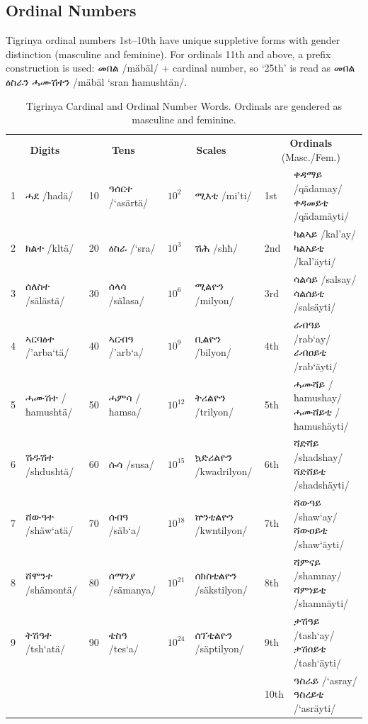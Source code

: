 \documentclass{article}
\newcommand{\tiipa}[2]{{\geezfont #1} /#2/}
\begin{document}
\subsection{Ordinal Numbers}

Tigrinya ordinal numbers 1st--10th have unique suppletive forms with gender distinction (masculine and feminine). For ordinals 11th and above, a prefix construction is used: \tiipa{መበል}{mäbäl} + cardinal number, so `25th' is read as \tiipa{መበል ዕስራን ሓሙሽተን}{mäbäl `sran ħamushtän}.

\begin{table}[t]
\caption{Tigrinya Cardinal and Ordinal Number Words. Ordinals are gendered as masculine and feminine.}
\label{tab:numbers}
\centering
\footnotesize
\begin{tabular}{@{\hspace{3pt}}cl@{\hspace{9pt}}cl@{\hspace{9pt}}ll@{\hspace{9pt}}ll@{\hspace{3pt}}}
\toprule
\multicolumn{2}{c}{\textbf{Digits}} & \multicolumn{2}{c}{\textbf{Tens}} & \multicolumn{2}{c}{\textbf{Scales}} & \multicolumn{2}{c}{\textbf{Ordinals} (Masc./Fem.)} \\
\cmidrule(r){1-2} \cmidrule(lr){3-4} \cmidrule(lr){5-6} \cmidrule(l){7-8}
1 & \tiipa{ሓደ}{ħadä} & 10 & \tiipa{ዓሰርተ}{`asärtä} & $10^2$ & \tiipa{ሚእቲ}{mi'ti} & 1st & \tiipa{ቀዳማይ}{qädamay} \tiipa{ቀዳመይቲ}{qädamäyti} \\
2 & \tiipa{ክልተ}{kltä} & 20 & \tiipa{ዕስራ}{`sra} & $10^3$ & \tiipa{ሽሕ}{shħ} & 2nd & \tiipa{ካልኣይ}{kal'ay} \tiipa{ካልአይቲ}{kal'äyti} \\
3 & \tiipa{ሰለስተ}{sälästä} & 30 & \tiipa{ሰላሳ}{sälasa} & $10^6$ & \tiipa{ሚልዮን}{milyon} & 3rd & \tiipa{ሳልሳይ}{salsay} \tiipa{ሳልሰይቲ}{salsäyti} \\
4 & \tiipa{ኣርባዕተ}{'arba`tä} & 40 & \tiipa{ኣርብዓ}{'arb`a} & $10^9$ & \tiipa{ቢልዮን}{bilyon} & 4th & \tiipa{ራብዓይ}{rab`ay} \tiipa{ራብዐይቲ}{rab`äyti} \\
5 & \tiipa{ሓሙሽተ}{ħamushtä} & 50 & \tiipa{ሓምሳ}{ħamsa} & $10^{12}$ & \tiipa{ትሪልዮን}{trilyon} & 5th & \tiipa{ሓሙሻይ}{ħamushay} \tiipa{ሓሙሸይቲ}{ħamushäyti} \\
6 & \tiipa{ሽዱሽተ}{shdushtä} & 60 & \tiipa{ሱሳ}{susa} & $10^{15}$ & \tiipa{ኳድሪልዮን}{kwadrilyon} & 6th & \tiipa{ሻድሻይ}{shadshay} \tiipa{ሻድሸይቲ}{shadshäyti} \\
7 & \tiipa{ሸውዓተ}{shäw`atä} & 70 & \tiipa{ሰብዓ}{säb`a} & $10^{18}$ & \tiipa{ኵንቲልዮን}{kwntilyon} & 7th\footnotemark & \tiipa{ሻውዓይ}{shaw`ay} \tiipa{ሻውዐይቲ}{shaw`äyti} \\
8 & \tiipa{ሸሞንተ}{shämontä} & 80 & \tiipa{ሰማንያ}{sämanya} & $10^{21}$ & \tiipa{ሰክስቲልዮን}{säkstilyon} & 8th & \tiipa{ሻምናይ}{shamnay} \tiipa{ሻምነይቲ}{shamnäyti} \\
9 & \tiipa{ትሽዓተ}{tsh`atä} & 90 & \tiipa{ቴስዓ}{tes`a} & $10^{24}$ & \tiipa{ሰፕቲልዮን}{säptilyon} & 9th & \tiipa{ታሽዓይ}{tash`ay} \tiipa{ታሽዐይቲ}{tash`äyti} \\
 & & & & & & 10th & \tiipa{ዓስራይ}{`asray} \tiipa{ዓስረይቲ}{`asräyti} \\
\bottomrule
\end{tabular}
\end{table}
\end{document}
